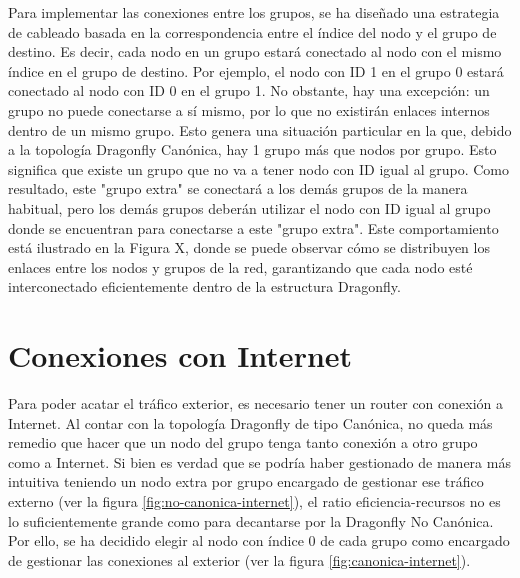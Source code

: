 \documentclass[%
    school=etsisi,%
    degree=61TI,%
]{upm-report}
\begin{document}
Para implementar las conexiones entre los grupos, se ha diseñado una estrategia de cableado basada en la correspondencia entre el índice del nodo y el grupo de destino. Es decir, cada nodo en un grupo estará conectado al nodo con el mismo índice en el grupo de destino. Por ejemplo, el nodo con ID 1 en el grupo 0 estará conectado al nodo con ID 0 en el grupo 1. No obstante, hay una excepción: un grupo no puede conectarse a sí mismo, por lo que no existirán enlaces internos dentro de un mismo grupo. Esto genera una situación particular en la que, debido a la topología Dragonfly Canónica, hay 1 grupo más que nodos por grupo. Esto significa que existe un grupo que no va a tener nodo con ID igual al grupo. Como resultado, este "grupo extra" se conectará a los demás grupos de la manera habitual, pero los demás grupos deberán utilizar el nodo con ID igual al grupo donde se encuentran para conectarse a este "grupo extra". Este comportamiento está ilustrado en la Figura X, donde se puede observar cómo se distribuyen los enlaces entre los nodos y grupos de la red, garantizando que cada nodo esté interconectado eficientemente dentro de la estructura Dragonfly.

\section{Conexiones con Internet}
\label{sec:conexiones-internet}

Para poder acatar el tráfico exterior, es necesario tener un router con conexión a Internet. Al contar con la topología Dragonfly de tipo Canónica, no queda más remedio que hacer que un nodo del grupo tenga tanto conexión a otro grupo como a Internet. Si bien es verdad que se podría haber gestionado de manera más intuitiva teniendo un nodo extra por grupo encargado de gestionar ese tráfico externo (ver la figura \ref{fig:no-canonica-internet}), el ratio eficiencia-recursos no es lo suficientemente grande como para decantarse por la Dragonfly No Canónica. Por ello, se ha decidido elegir al nodo con índice 0 de cada grupo como encargado de gestionar las conexiones al exterior (ver la figura \ref{fig:canonica-internet}).
\end{document}
